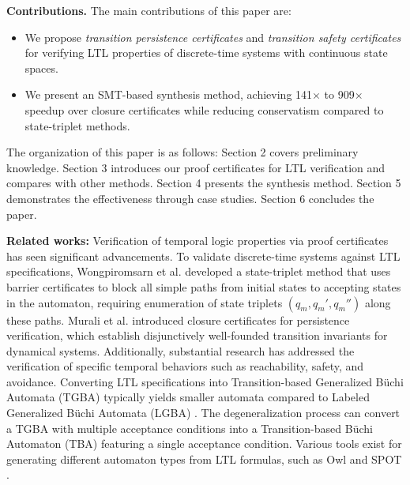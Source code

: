 
\textbf{Contributions.} The main contributions of this paper are:
\begin{itemize}
  \item We propose \emph{transition persistence certificates} and \emph{transition safety certificates} for verifying LTL properties of discrete-time systems with continuous state spaces.
  \item We present an SMT-based synthesis method, achieving 141$\times$ to 909$\times$ speedup over closure certificates while reducing conservatism compared to state-triplet methods.
\end{itemize}

The organization of this paper is as follows: Section 2 covers preliminary knowledge. Section 3 introduces our proof certificates for LTL verification and compares with other methods. Section 4 presents the synthesis method. Section 5 demonstrates the effectiveness through case studies. Section 6 concludes the paper.


\textbf{Related works: } Verification of temporal logic properties via proof certificates has seen significant advancements. To validate discrete-time systems against LTL specifications, Wongpiromsarn et al. \cite{wongpiromsarn2015automata} developed a state-triplet method that uses barrier certificates to block all simple paths from initial states to accepting states in the automaton, requiring enumeration of state triplets $(q_m, q_m', q_m'')$ along these paths. Murali et al. \cite{murali2024closure} introduced closure certificates for persistence verification, which establish disjunctively well-founded transition invariants \cite{podelski2004transition} for dynamical systems. Additionally, substantial research has addressed the verification of specific temporal behaviors such as reachability, safety, and avoidance\cite{chakarov2013probabilistic,chatterjee2016algorithmic,chatterjee2024sound,chatterjee2024equivalence}. Converting LTL specifications into Transition-based Generalized Büchi Automata (TGBA) typically yields smaller automata compared to Labeled Generalized Büchi Automata (LGBA) \cite{couvreur1999fly}. The degeneralization process \cite{giannakopoulou2002states} can convert a TGBA with multiple acceptance conditions into a Transition-based Büchi Automaton (TBA) featuring a single acceptance condition. Various tools exist for generating different automaton types from LTL formulas, such as Owl \cite{owl} and SPOT \cite{spot}.
